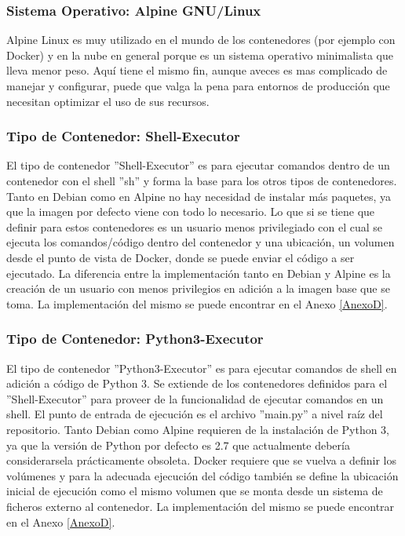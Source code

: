 \subsubsection{Sistema Operativo: Alpine GNU/Linux}
Alpine Linux es muy utilizado en el mundo de los contenedores (por ejemplo con Docker) y en la nube en general porque es un sistema operativo minimalista que lleva menor peso. Aquí tiene el mismo fin, aunque aveces es mas complicado de manejar y configurar, puede que valga la pena para entornos de producción que necesitan optimizar el uso de sus recursos.

\subsubsection{Tipo de Contenedor: Shell-Executor}
El tipo de contenedor ''Shell-Executor'' es para ejecutar comandos dentro de un contenedor con el shell ''sh'' y forma la base para los otros tipos de contenedores. Tanto en Debian como en Alpine no hay necesidad de instalar más paquetes, ya que la imagen por defecto viene con todo lo necesario. Lo que si se tiene que definir para estos contenedores es un usuario menos privilegiado con el cual se ejecuta los comandos/código dentro del contenedor y una ubicación, un volumen desde el punto de vista de Docker, donde se puede enviar el código a ser ejecutado. La diferencia entre la implementación tanto en Debian y Alpine es la creación de un usuario con menos privilegios en adición a la imagen base que se toma. La implementación del mismo se puede encontrar en el Anexo \ref{AnexoD}.

\subsubsection{Tipo de Contenedor: Python3-Executor}
El tipo de contenedor ''Python3-Executor'' es para ejecutar comandos de shell en adición a código de Python 3. Se extiende de los contenedores definidos para el ''Shell-Executor'' para proveer de la funcionalidad de ejecutar comandos en un shell. El punto de entrada de ejecución es el archivo ''main.py'' a nivel raíz del repositorio. Tanto Debian como Alpine requieren de la instalación de Python 3, ya que la versión de Python por defecto es 2.7 que actualmente debería considerarsela prácticamente obsoleta. Docker requiere que se vuelva a definir los volúmenes y para la adecuada ejecución del código también se define la ubicación inicial de ejecución como el mismo volumen que se monta desde un sistema de ficheros externo al contenedor. La implementación del mismo se puede encontrar en el Anexo \ref{AnexoD}.

